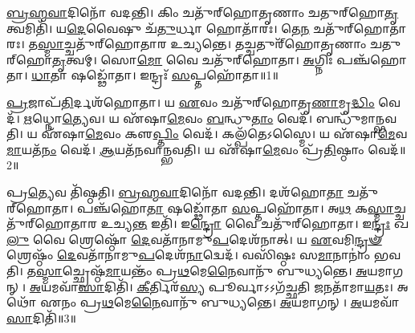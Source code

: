 \clearpage
{}
\setcounter{anuvakam}{0}

\-\ul{𑌬𑍍𑌰}\-\-\ul{𑌹𑍍𑌮}\-\-\ul{𑌵𑌾}\-𑌦𑌿𑌨𑍋᳴ 𑌵𑌦𑌨𑍍𑌤𑌿।
𑌕𑌿𑌂 𑌚𑌤𑍁᳴𑌰𑍍‌\mbox{}𑌹𑍋𑌤𑍃𑌣𑌾𑌂 𑌚𑌤𑍁𑌰𑍍‌\mbox{}𑌹𑍋\-\ul{𑌤𑍃}\-𑌤𑍍𑌵𑌮𑌿𑌤𑌿᳴।
𑌯\-\ul{𑌦𑍇}\-𑌵𑍈𑌷𑍁 𑌚᳴\-\ul{𑌤𑍁}\-𑌰𑍍𑌧𑌾 𑌹𑍋𑌤𑌾᳴𑌰𑌃।
𑌤𑍇\-\ul{𑌨} 𑌚𑌤𑍁᳴𑌰𑍍‌\mbox{}𑌹𑍋𑌤𑌾𑌰𑌃।
𑌤\-\ul{𑌸𑍍𑌮𑌾}\-𑌚𑍍𑌚𑌤𑍁᳴𑌰𑍍‌\mbox{}𑌹𑍋𑌤𑌾𑌰 𑌉𑌚𑍍𑌯𑌨𑍍𑌤𑍇।
𑌤𑌚𑍍𑌚𑌤𑍁𑌰𑍍᳴𑌹𑍋𑌤𑍃𑌣𑌾𑌂 𑌚𑌤𑍁𑌰𑍍‌\mbox{}𑌹𑍋\-\ul{𑌤𑍃}\-𑌤𑍍𑌵𑌮𑍍।
𑌸𑍋\-\ul{𑌮𑍋} 𑌵𑍈 𑌚𑌤𑍁᳴𑌰𑍍‌\mbox{}𑌹𑍋𑌤𑌾।
\-\ul{𑌅}\-𑌗𑍍𑌨𑌿𑌃 𑌪𑌞𑍍𑌚᳴𑌹𑍋𑌤𑌾।
\-\ul{𑌧𑌾}\-𑌤𑌾 𑌷𑌡𑍍𑌢𑍋᳴𑌤𑌾।
𑌇𑌨𑍍𑌦𑍍𑌰𑌃᳴ \ul{𑌸}\-𑌪𑍍𑌤𑌹𑍋᳴𑌤𑌾॥1॥

\-\ul{𑌪𑍍𑌰}\-𑌜𑌾𑌪᳴\-\ul{𑌤𑌿}\-𑌰𑍍𑌦𑌶᳴𑌹𑍋𑌤𑌾।
𑌯 \ul{𑌏}\-𑌵𑌂 𑌚𑌤𑍁᳴𑌰𑍍‌\mbox{}𑌹𑍋𑌤𑍃\-\ul{𑌣𑌾}\-𑌮𑍃\-\ul{𑌦𑍍𑌧𑌿𑌂} 𑌵𑍇𑌦᳴।
\-\ul{𑌋}\-𑌧𑍍𑌨𑍋\-\ul{𑌤𑍍𑌯𑍇}\-𑌵।
𑌯 𑌏᳴𑌷𑌾\-\ul{𑌮𑍇}\-𑌵𑌂 \ul{𑌬}\-𑌨𑍍𑌧𑍁\-\ul{𑌤𑌾𑌂} 𑌵𑍇𑌦᳴।
𑌬𑌨𑍍𑌧𑍁᳴𑌮𑌾𑌨𑍍𑌭𑌵𑌤𑌿।
𑌯 𑌏᳴𑌷𑌾\-\ul{𑌮𑍇}\-𑌵𑌂 𑌕𑍢\-\ul{𑌪𑍍𑌤𑌿𑌂} 𑌵𑍇𑌦᳴।
𑌕𑌲𑍍𑌪᳴𑌤𑍇\-𑌽𑌸𑍍𑌮𑍈।
𑌯 𑌏᳴𑌷𑌾\-\ul{𑌮𑍇}\-𑌵\-\ul{𑌮𑌾}\-𑌯𑌤᳴\-\ul{𑌨𑌂} 𑌵𑍇𑌦᳴।
\-\ul{𑌆}\-𑌯𑌤᳴𑌨𑌵𑌾𑌨𑍍𑌭𑌵𑌤𑌿।
𑌯 𑌏᳴𑌷𑌾\-\ul{𑌮𑍇}\-𑌵𑌂 𑌪𑍍𑌰᳴\-\ul{𑌤𑌿}\-𑌷𑍍𑌠𑌾𑌂 𑌵𑍇𑌦᳴॥2॥

𑌪𑍍𑌰\-\ul{𑌤𑍍𑌯𑍇}\-𑌵 𑌤𑌿᳴𑌷𑍍𑌠𑌤𑌿।
\-\ul{𑌬𑍍𑌰}\-\-\ul{𑌹𑍍𑌮}\-\-\ul{𑌵𑌾}\-𑌦𑌿𑌨𑍋᳴ 𑌵𑌦𑌨𑍍𑌤𑌿।
𑌦𑌶᳴𑌹𑍋\-\ul{𑌤𑌾} 𑌚𑌤𑍁᳴𑌰𑍍‌\mbox{}𑌹𑍋𑌤𑌾।
𑌪𑌞𑍍𑌚᳴𑌹𑍋\-\ul{𑌤𑌾} 𑌷𑌡𑍍𑌢𑍋᳴𑌤𑌾 \ul{𑌸}\-𑌪𑍍𑌤𑌹𑍋᳴𑌤𑌾।
𑌅\-\ul{𑌥} 𑌕\-\ul{𑌸𑍍𑌮𑌾}\-𑌚𑍍𑌚𑌤𑍁᳴𑌰𑍍‌\mbox{}𑌹𑍋𑌤𑌾𑌰 𑌉𑌚𑍍𑌯\-\ul{𑌨𑍍𑌤} 𑌇𑌤𑌿᳴।
𑌇\-\ul{𑌨𑍍𑌦𑍍𑌰𑍋} 𑌵𑍈 𑌚𑌤𑍁᳴𑌰𑍍‌\mbox{}𑌹𑍋𑌤𑌾।
𑌇\-\ul{𑌨𑍍𑌦𑍍𑌰𑌃} 𑌖\-\ul{𑌲𑍁} 𑌵𑍈 𑌶𑍍𑌰𑍇𑌷𑍍𑌠𑍋᳴ \ul{𑌦𑍇}\-𑌵𑌤𑌾᳴𑌨𑌾𑌮𑍁\-\ul{𑌪}\-\-𑌦𑍇𑌶᳴𑌨𑌾𑌤𑍍।
𑌯 \ul{𑌏}\-𑌵𑌮𑌿\-\ul{𑌨𑍍𑌦𑍍𑌰}\-\-\ul{𑍟} 𑌶𑍍𑌰𑍇𑌷𑍍𑌠𑌂᳴ \ul{𑌦𑍇}\-𑌵𑌤𑌾᳴𑌨𑌾𑌮𑍁\-\ul{𑌪}\-\-𑌦𑍇𑌶᳴\-\ul{𑌨𑌾}\-𑌦𑍍𑌵𑍇𑌦᳴।
𑌵𑌸𑌿᳴𑌷𑍍𑌠𑌃 𑌸\-\ul{𑌮𑌾}\-𑌨𑌾𑌨𑌾𑌂॑ 𑌭𑌵𑌤𑌿।
𑌤\-\ul{𑌸𑍍𑌮𑌾}\-𑌚𑍍𑌛𑍍𑌰𑍇𑌷𑍍𑌠᳴\-\ul{𑌮𑌾}\-𑌯𑌨𑍍𑌤𑌂᳴ 𑌪𑍍𑌰\-\ul{𑌥}\-𑌮𑍇\-\ul{𑌨𑍈}\-𑌵𑌾𑌨𑍁᳴ 𑌬𑍁𑌧𑍍𑌯𑌨𑍍𑌤𑍇।
\-\ul{𑌅}\-𑌯𑌮𑌾𑌗𑌨𑍍।
\-\ul{𑌅}\-𑌯𑌮𑌵𑌾᳴\-\ul{𑌸𑌾}\-𑌦𑌿𑌤𑌿᳴।
\-\ul{𑌕𑍀}\-𑌰𑍍𑌤𑌿𑌰᳴\-\ul{𑌸𑍍𑌯} 𑌪𑍂𑌰𑍍𑌵𑌾\-𑌽𑌽𑌗᳴𑌚𑍍𑌛𑌤𑌿 \ul{𑌜}\-𑌨𑌤𑌾᳴𑌮𑌾\-\ul{𑌯}\-𑌤𑌃।
𑌅𑌥𑍋᳴ 𑌏𑌨𑌂 𑌪𑍍𑌰\-\ul{𑌥}\-𑌮𑍇\-\ul{𑌨𑍈}\-𑌵𑌾𑌨𑍁᳴ 𑌬𑍁𑌧𑍍𑌯𑌨𑍍𑌤𑍇।
\-\ul{𑌅}\-𑌯𑌮𑌾𑌗𑌨𑍍।
\-\ul{𑌅}\-𑌯𑌮𑌵𑌾᳴\-\ul{𑌸𑌾}\-𑌦𑌿𑌤𑌿᳴॥3॥\anuvakamend[\-\ul{𑌸}\-𑌪𑍍𑌤𑌹𑍋᳴𑌤𑌾 𑌪𑍍𑌰\-\ul{𑌤𑌿}\-𑌷𑍍𑌠𑌾𑌂 𑌵𑍇𑌦᳴ 𑌬𑍁𑌧𑍍𑌯\-\ul{𑌨𑍍𑌤𑍇} 𑌷𑌟𑍍𑌚᳴]

